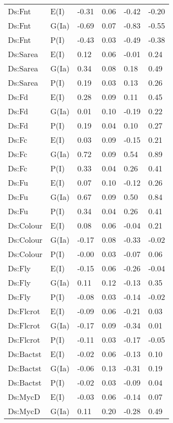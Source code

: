 \begin{center}
\begin{longtable}{|p{1.1in}|p{0.7in}|p{0.7in}|p{0.6in}|p{0.6in}|p{0.6in}|}
  Ds:Fnt & E(I) & -0.31 & 0.06 & -0.42 & -0.20 \\ 
  Ds:Fnt & G(Ia) & -0.69 & 0.07 & -0.83 & -0.55 \\ 
  Ds:Fnt & P(I) & -0.43 & 0.03 & -0.49 & -0.38 \\ 
  Ds:Sarea & E(I) & 0.12 & 0.06 & -0.01 & 0.24 \\ 
  Ds:Sarea & G(Ia) & 0.34 & 0.08 & 0.18 & 0.49 \\ 
  Ds:Sarea & P(I) & 0.19 & 0.03 & 0.13 & 0.26 \\ 
  Ds:Fd & E(I) & 0.28 & 0.09 & 0.11 & 0.45 \\ 
  Ds:Fd & G(Ia) & 0.01 & 0.10 & -0.19 & 0.22 \\ 
  Ds:Fd & P(I) & 0.19 & 0.04 & 0.10 & 0.27 \\ 
  Ds:Fc & E(I) & 0.03 & 0.09 & -0.15 & 0.21 \\ 
  Ds:Fc & G(Ia) & 0.72 & 0.09 & 0.54 & 0.89 \\ 
  Ds:Fc & P(I) & 0.33 & 0.04 & 0.26 & 0.41 \\ 
  Ds:Fu & E(I) & 0.07 & 0.10 & -0.12 & 0.26 \\ 
  Ds:Fu & G(Ia) & 0.67 & 0.09 & 0.50 & 0.84 \\ 
  Ds:Fu & P(I) & 0.34 & 0.04 & 0.26 & 0.41 \\ 
  Ds:Colour & E(I) & 0.08 & 0.06 & -0.04 & 0.21 \\ 
  Ds:Colour & G(Ia) & -0.17 & 0.08 & -0.33 & -0.02 \\ 
  Ds:Colour & P(I) & -0.00 & 0.03 & -0.07 & 0.06 \\ 
  Ds:Fly & E(I) & -0.15 & 0.06 & -0.26 & -0.04 \\ 
  Ds:Fly & G(Ia) & 0.11 & 0.12 & -0.13 & 0.35 \\ 
  Ds:Fly & P(I) & -0.08 & 0.03 & -0.14 & -0.02 \\ 
  Ds:Flcrot & E(I) & -0.09 & 0.06 & -0.21 & 0.03 \\ 
  Ds:Flcrot & G(Ia) & -0.17 & 0.09 & -0.34 & 0.01 \\ 
  Ds:Flcrot & P(I) & -0.11 & 0.03 & -0.17 & -0.05 \\ 
  Ds:Bactst & E(I) & -0.02 & 0.06 & -0.13 & 0.10 \\ 
  Ds:Bactst & G(Ia) & -0.06 & 0.13 & -0.31 & 0.19 \\ 
  Ds:Bactst & P(I) & -0.02 & 0.03 & -0.09 & 0.04 \\ 
  Ds:MycD & E(I) & -0.03 & 0.06 & -0.14 & 0.07 \\ 
  Ds:MycD & G(Ia) & 0.11 & 0.20 & -0.28 & 0.49 \\ 

\end{longtable}
\end{center}
